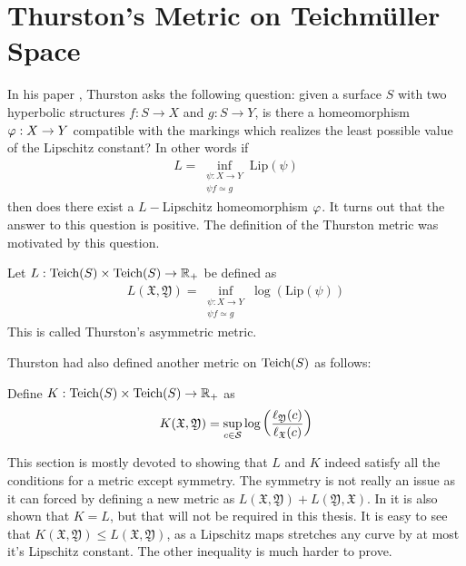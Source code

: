 \section{Thurston's Metric on Teichm\"{u}ller Space}
In his paper \cite{thurston}, Thurston asks the following question: given a surface $S$ with two hyperbolic structures $f:S\to X$ and $g:S\to Y$, is there a homeomorphism $\varphi:X\to Y$ compatible with the markings which realizes the least possible value of the Lipschitz constant? In other words if
\begin{align}
  L = \inf_{\substack{\psi:X\to Y\\ \psi f\simeq g}} \text{Lip}(\psi) 
\end{align}
then does there exist a $L-$Lipschitz homeomorphism $\varphi$. It turns out that the answer to this question is positive. The definition of the Thurston metric was motivated by this question. 
\begin{definition}
  Let $L:\text{Teich}(S)\times \text{Teich}(S) \to \mathbb{R}_{+}$ be defined as
  \begin{align}
    L( \mathfrak{X}, \mathfrak{Y}) = \inf_{\substack{\psi:X\to Y\\ \psi f\simeq g}} \log(\text{Lip}(\psi))
  \end{align}
  This is called Thurston's asymmetric metric.
\end{definition}
Thurston had also defined another metric on $\text{Teich}(S)$ as follows:
\begin{definition}
  Define $K: \text{Teich}(S)\times \text{Teich}(S) \to \mathbb{R}_{+}$ as
  \begin{align}
    K( \mathfrak{X}, \mathfrak{Y}) = \sup_{c\in \mathcal{S}} \log\left(\frac{\ell_\mathfrak{Y}(c)}{ \ell_\mathfrak{X}(c)}\right) 
  \end{align}
\end{definition}
This section is mostly devoted to showing that $L$ and $K$ indeed satisfy all the conditions for a metric except symmetry. The symmetry is not really an issue as it can forced by defining a new metric as $L( \mathfrak{X}, \mathfrak{Y}) + L( \mathfrak{Y}, \mathfrak{X})$. In \cite{thurston} it is also shown that $K=L$, but that will not be required in this thesis. It is easy to see that $K( \mathfrak{X}, \mathfrak{Y}) \leq L( \mathfrak{X}, \mathfrak{Y})$, as a Lipschitz maps stretches any curve by at most it's Lipschitz constant. The other inequality is much harder to prove.\\

